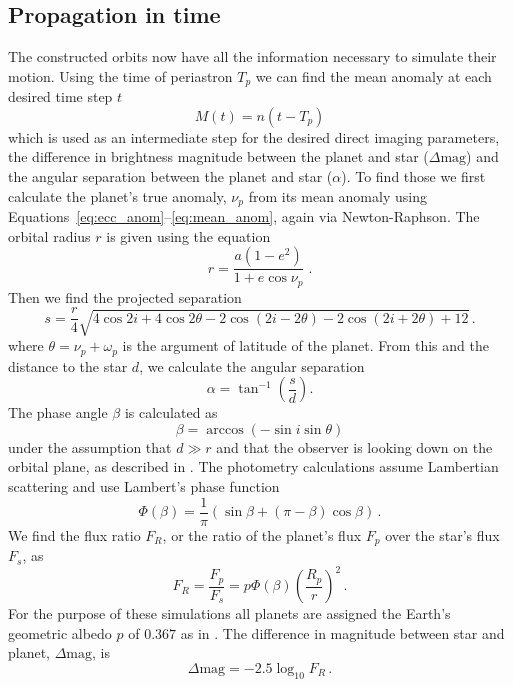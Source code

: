\subsection{Propagation in time}
The constructed orbits now have all the information necessary to simulate their motion.  Using the time of
periastron $T_p$ we can find the mean anomaly at each desired time step $t$
\begin{equation}
    M(t) = n (t - T_p)
\end{equation}
which is used as an intermediate step for the desired direct imaging parameters, the difference in
brightness magnitude between the planet and star ($\Delta\mathrm{mag}$) and the angular separation
between the planet and star ($\alpha$).  To find those we first calculate the planet's true anomaly,
$\nu_p$ from its mean anomaly using Equations~\ref{eq:ecc_anom}--\ref{eq:mean_anom}, again via Newton-Raphson. The orbital radius $r$ is given using the
equation
\begin{equation}%
    \label{eq:r}
    r = \frac{a \left( 1 -e^2 \right) }{1 + e \cos \nu_p } \;
.\end{equation}
Then we find the projected separation
\begin{equation}
    s = \frac{r}{4} \sqrt{4 \cos{2i} + 4 \cos{2\theta} - 2\cos( {2i-2\theta} ) - 2\cos({2i+2\theta}) + 12} \,.
\end{equation}
where $\theta = \nu_p + \omega_p $ is the argument of latitude of the planet.
From this and the distance to the star $d$, we calculate the angular separation
\begin{equation}%
    \label{eq:alpha}
    \alpha = \tan^{-1}\left( \frac{s}{d} \right)
.\end{equation}
The phase angle $\beta$ is calculated as
\begin{equation}%
    \label{eq:beta}
    \beta = \arccos( {-\sin{i}\sin{\theta}} )
\end{equation}
under the assumption that $d \gg r$ and that the observer is looking down on the orbital plane, as described in \citet{savranskyExplorationDynamical2019}.
The photometry calculations assume Lambertian scattering and use Lambert's phase function
\begin{equation}
    \Phi(\beta) = \frac{1}{\pi} \left( \sin\beta + (\pi-\beta) \cos\beta\right) \,.
\end{equation}
We find the flux ratio $F_R$, or the ratio of the planet's flux $F_p$ over the star's flux $F_s$,
as
\begin{equation}
    F_R = \frac{F_p}{F_s} = p\Phi(\beta)\left(\frac{R_p}{r}\right)^2 \,.
\end{equation}
For the purpose of these simulations all planets are assigned the Earth's geometric albedo $p$ of
$0.367$ as in \citet{Seidelmann2006}.
The difference in magnitude between star and planet, $\Delta\mathrm{mag}$, is
\begin{equation}
    \Delta\mathrm{mag} = -2.5\log_{10}F_R \,.
\end{equation}


